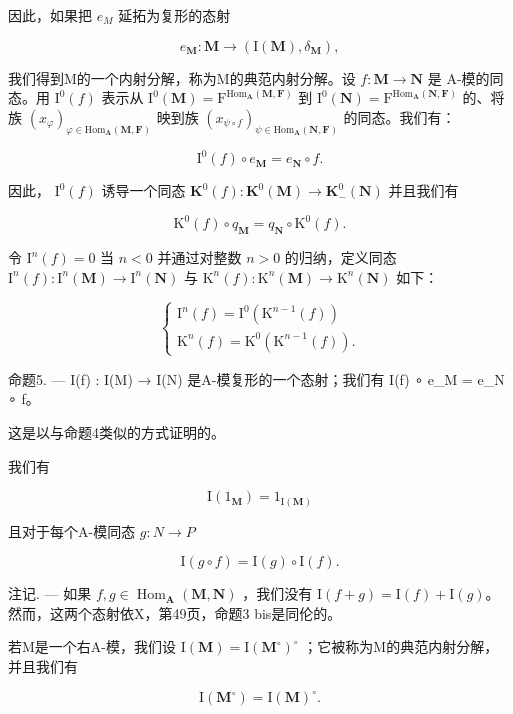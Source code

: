 因此，如果把 \(e_{M}\) 延拓为复形的态射

\[
e _ {\mathbf {M}}: \mathbf {M} \rightarrow (\mathrm{I} (\mathbf {M}), \delta_ {\mathbf {M}}),
\]

我们得到M的一个内射分解，称为M的典范内射分解。设 \(f: \mathbf{M} \to \mathbf{N}\) 是 A-模的同态。用 \(\mathrm{I}^{0}(f)\) 表示从 \(\mathrm{I}^{0}(\mathbf{M}) = \mathrm{F}^{\mathrm{Hom}_{\mathbf{A}}(\mathbf{M},\mathbf{F})}\) 到 \(\mathrm{I}^{0}(\mathbf{N}) = \mathrm{F}^{\mathrm{Hom}_{\mathbf{A}}(\mathbf{N},\mathbf{F})}\) 的、将族 \((x_{\varphi})_{\varphi \in \mathrm{Hom}_{\mathbf{A}}(\mathbf{M},\mathbf{F})}\) 映到族 \((x_{\psi \circ f})_{\psi \in \mathrm{Hom}_{\mathbf{A}}(\mathbf{N},\mathbf{F})}\) 的同态。我们有：

\[
\mathrm{I} ^ {0} (f) \circ e _ {\mathbf {M}} = e _ {\mathbf {N}} \circ f.\tag{11}
\]

因此， \(\mathrm{I}^0 (f)\) 诱导一个同态 \(\mathbf{K}^0 (f):\mathbf{K}^0 (\mathbf{M})\to \mathbf{K}_-^0 (\mathbf{N})\) 并且我们有

\[
\mathrm{K} ^ {0} (f) \circ q _ {\mathbf {M}} = q _ {\mathbf {N}} \circ \mathrm{K} ^ {0} (f).\tag{12}
\]

令 \(\mathrm{I}^n(f) = 0\) 当 \(n < 0\) 并通过对整数 \(n > 0\) 的归纳，定义同态 \(\mathrm{I}^n(f): \mathrm{I}^n(\mathbf{M}) \to \mathrm{I}^n(\mathbf{N})\) 与 \(\mathrm{K}^n(f): \mathrm{K}^n(\mathbf{M}) \to \mathrm{K}^n(\mathbf{N})\) 如下：

\[
\left\{ \begin{array}{l} \mathrm{I} ^ {n} (f) = \mathrm{I} ^ {0} (\mathrm{K} ^ {n - 1} (f)) \\ \mathrm{K} ^ {n} (f) = \mathrm{K} ^ {0} (\mathrm{K} ^ {n - 1} (f)). \end{array} \right.\tag{13}
\]

命题5. --- I(f) : I(M) → I(N) 是A-模复形的一个态射；我们有 I(f) ∘ e\_M = e\_N ∘ f。

这是以与命题4类似的方式证明的。

我们有

\[
\mathrm{I} (1 _ {\mathbf {M}}) = 1 _ {\mathrm{I} (\mathbf {M})}\tag{14}
\]

且对于每个A-模同态 \(g: N \rightarrow P\)

\[
\mathrm{I} (g \circ f) = \mathrm{I} (g) \circ \mathrm{I} (f).\tag{15}
\]

注记. --- 如果 \(f, g \in \operatorname{Hom}_{\mathbf{A}}(\mathbf{M}, \mathbf{N})\) ，我们没有 \(\mathrm{I}(f + g) = \mathrm{I}(f) + \mathrm{I}(g)\)。然而，这两个态射依X，第49页，命题3 bis是同伦的。

若M是一个右A-模，我们设 \(\mathrm{I}(\mathbf{M}) = \mathrm{I}(\mathbf{M}^{\circ})^{\circ}\) ；它被称为M的典范内射分解，并且我们有

\[
\mathrm{I} (\mathbf {M} ^ {\circ}) = \mathrm{I} (\mathbf {M}) ^ {\circ}.
\]

